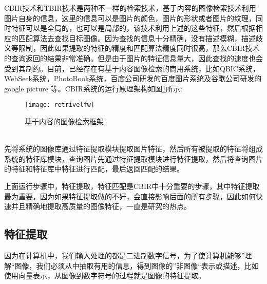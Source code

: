 CBIR技术和TBIR技术是两种不一样的检索技术，基于内容的图像检索技术利用图片自身的信息，这里的信息可以是图片的颜色，图片的形状或者图片的纹理，同时特征可以是全局的，也可以是局部的，该技术利用上述的这些特征，然后根据相应的匹配算法去查找目标图像。因为查找的信息十分精确，没有描述模糊，描述歧义等限制，因此如果提取的特征的精度和匹配算法精度同时很高，那么CBIR技术的查询返回的结果非常准确。但是由于图片的特征信息量大，因此查找的速度也会受到其制约。目前，已经存在有基于内容图像检索的商用系统，比如QBIC系统，WebSeek系统，PhotoBook系统，百度公司研发的百度图片系统及谷歌公司研发的google picture 等。CBIR系统的运行原理架构如图\ref{fig:CBIR_fw}所示:
\begin{figure}[htp]
\centering
\texttt{[image: retrivelfw]}
\caption{基于内容的图像检索框架}
\label{fig:CBIR_fw}
\end{figure}
\\先将系统的图像库通过特征提取模块提取图片特征，然后所有被提取的特征将组成系统的特征库模块，查询图片先通过特征提取模块进行特征提取，然后将查询图片的特征和特征库中特征进行匹配，最后返回匹配的结果。

上面运行步骤中，特征提取，特征匹配是CBIR中十分重要的步骤，其中特征提取最为重要，因为如果特征提取做的不好，会直接影响后面的所有步骤，因此如何快速并且精确地提取高质量的图像特征，一直是研究的热点。

\subsection{特征提取}
因为在计算机中，我们输入处理的都是二进制数字信号，为了使计算机能够”理解“图像，我们必须从中抽取有用的信息，得到图像的”非图像“表示或描述，比如使用向量表示，从图像到数字符号的过程就是图像的特征提取。
